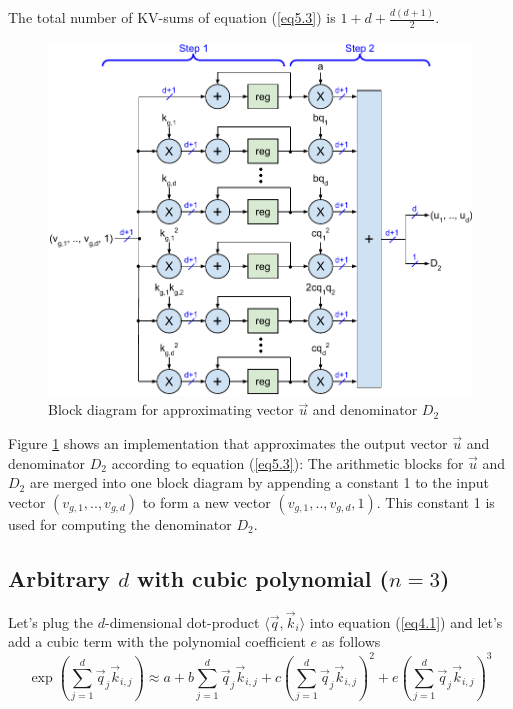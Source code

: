 \documentclass{article}
\numberwithin{equation}{section} %
\newcommand{\dpro}[1]{\langle #1 \rangle}  %
\def\q{\vec{q}}
\def\k{\vec{k}}
\def\u{\vec{u}}
\def\dotqk{\dpro{\q, \k_i}}  %
\begin{document}
The total number of KV-sums of equation (\ref{eq5.3}) is $1 + d + \frac{d(d+1)}{2}$.

\begin{figure}[h!] \centering  %
  \includegraphics[scale=0.86]{figs/approximate_fig5.pdf}
  \caption{Block diagram for approximating vector $\u$ and denominator $D_2$}
\label{fig5} \end{figure}

Figure \ref{fig5} shows an implementation that approximates the output vector $\u$ and denominator $D_2$ according to equation (\ref{eq5.3}): The arithmetic blocks for $\u$ and $D_2$ are merged into one block diagram by appending a constant 1 to the input vector $(v_{g,1}, .., v_{g,d})$ to form a new vector $(v_{g,1}, ..,v_{g,d}, 1)$. This constant 1 is used for computing the denominator $D_2$.

\subsection{Arbitrary $d$ with cubic polynomial ($n = 3$)}
Let’s plug the $d$-dimensional dot-product $\dotqk$ into equation (\ref{eq4.1}) and let’s add a cubic term with the polynomial coefficient $e$ as follows
\begin{equation}
  \exp \left( \sum_{j=1}^d \q_j \k_{i,j} \right) \approx a + b \sum_{j=1}^d \q_j \k_{i,j}
  + c \left( \sum_{j=1}^d \q_j \k_{i,j} \right)^2
  + e \left( \sum_{j=1}^d \q_j \k_{i,j} \right)^3
\label{eq5.4} \end{equation}
\end{document}
